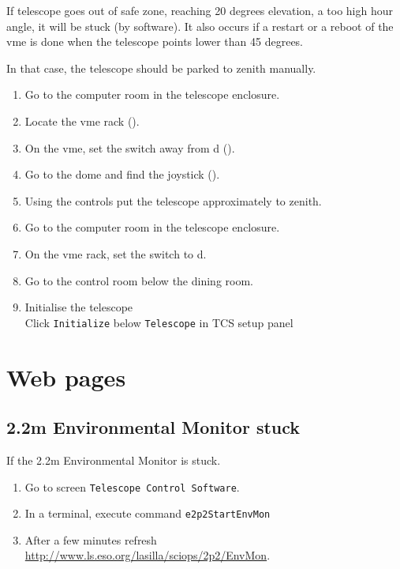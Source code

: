 \documentclass[11pt,fleqn,a4paper]{book}
\begin{document}
If telescope goes out of safe zone, reaching 20 degrees elevation, a too high hour angle, it will be stuck (by software). It also occurs if a restart or a reboot of the \gls{vme} is done when the telescope points lower than 45 degrees.

In that case, the telescope should be parked to zenith manually.

\label{proc:park}
\begin{enumerate}   
    \item Go to the \gls{computer room} in the telescope enclosure.
    \item Locate the \gls{vme} rack ().
    \item On the \gls{vme}, set the switch away from d ().
    \item Go to the \gls{dome} and find the joystick ().
    \item Using the controls put the telescope approximately to zenith.
    \item Go to the \gls{computer room} in the telescope enclosure.
    \item On the \gls{vme} rack, set the switch to d.
    \item Go to the \gls{control room} below the dining room.
    \item Initialise the telescope\\
          Click \texttt{Initialize} below \texttt{Telescope}  in \gls{TCS setup panel}
\end{enumerate}

\section{Web pages}

\subsection{2.2m Environmental Monitor stuck}
If the 2.2m Environmental Monitor is stuck.

\begin{enumerate}
  \item Go to screen \texttt{Telescope Control Software}.
  \item In a terminal, execute command \texttt{e2p2StartEnvMon}
  \item After a few minutes refresh \url{http://www.ls.eso.org/lasilla/sciops/2p2/EnvMon}.
\end{enumerate}
\end{document}
